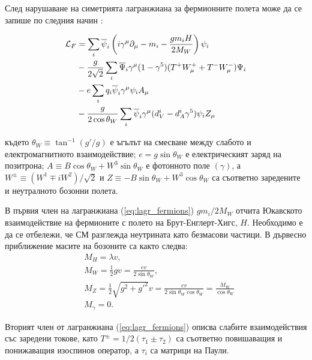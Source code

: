 \par След нарушаване на симетрията лагранжиана за фермионните полета може да се запише по следния начин \cite{PDG}:

\begin{align}
\label{eq:lagr_fermions}
\mathcal{L}_F &= \sum\limits_{i} \overline{\psi}_i \left(i \gamma^{\mu}\partial_{\mu} - m_i - \frac{g m_i H}{2 M_W}\right)\psi_i \nonumber\\
& -\frac{g}{2\sqrt{2}}\sum\limits_{i}\overline{\Psi}_i\gamma^{\mu}(1-\gamma^5)(T^{+}W_{\mu}^{+} + T^{-}W_{\mu}^{-})\Psi_i\\ \notag
& -e\sum\limits_{i}q_i\overline{\psi}_i\gamma^{\mu}\psi_i A_{\mu}\\ \notag
& -\frac{g}{2\cos \theta_W}\sum\limits_{i}\overline{\psi}_i\gamma^{\mu}(d^i_V - d^i_A \gamma^5)\psi_i Z_{\mu} \notag
\end{align}

където $\theta_W\equiv \tan^{-1}(g'/g)$ е ъгълът на смесване между слабото и електромагнитното взаимодействие; $e = g\sin \theta_W$ е електрическият заряд на позитрона; $A\equiv B\cos\theta_W + W^3\sin\theta_W$ е фотонното поле $(\gamma)$, а $W^{\pm}\equiv (W^1\mp i W^2)/\sqrt{2}$ и $Z\equiv -B\sin \theta_W + W^3\cos\theta_W$ са съответно заредените и неутралното бозонни полета.
\par В първия член на лагранжиана (\ref{eq:lagr_fermions}) $gm_i/2M_W$ отчита Юкавското взаимодействие на фермионите с полето на Брут-Енглерт-Хигс, $H$. 
Необходимо е да се отбележи, че СМ разглежда неутрината като безмасови частици. 
В дървесно приближение масите на бозоните са както следва:
\begin{align}
& M_H = \lambda v ,\\
& M_W = \frac{1}{2} g v = \frac{e v}{2 \sin \theta_W},\\
& M_Z = \frac{1}{2}\sqrt{g^2+{g'}^2}v = \frac{e v}{2 \sin \theta_W \cos\theta_W} = \frac{M_W}{\cos \theta_W}\\
& M_{\gamma} = 0.
\end{align}
\par Вторият член от лагранжиана (\ref{eq:lagr_fermions}) описва слабите взаимодействия със заредени токове, като $T^{\pm} = 1/2(\tau_1\pm \tau_2)$ са съответно повишаващия и понижаващия изоспинов оператор, а $\tau_i$ са матрици на Паули.

